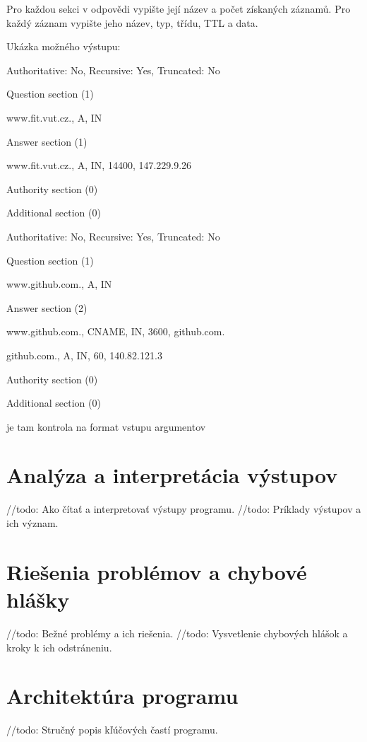 \documentclass[a4paper, 11pt]{article}
\begin{document}
	Pro každou sekci v odpovědi vypište její název a počet získaných záznamů. Pro každý záznam vypište jeho název, typ, třídu, TTL a data.



	Ukázka možného výstupu:




	Authoritative: No, Recursive: Yes, Truncated: No

	Question section (1)

	www.fit.vut.cz., A, IN

	Answer section (1)

	www.fit.vut.cz., A, IN, 14400, 147.229.9.26

	Authority section (0)

	Additional section (0)


	Authoritative: No, Recursive: Yes, Truncated: No

	Question section (1)

	www.github.com., A, IN

	Answer section (2)

	www.github.com., CNAME, IN, 3600, github.com.

	github.com., A, IN, 60, 140.82.121.3

	Authority section (0)

	Additional section (0)


	je tam kontrola na format vstupu argumentov
	\section{Analýza a interpretácia výstupov}
	//todo: Ako čítať a interpretovať výstupy programu.
	//todo: Príklady výstupov a ich význam.

	\section{Riešenia problémov a chybové hlášky}
	//todo: Bežné problémy a ich riešenia.
	//todo: Vysvetlenie chybových hlášok a kroky k ich odstráneniu.
	
	\section{Architektúra programu}
	//todo: Stručný popis kľúčových častí programu.
\end{document}
